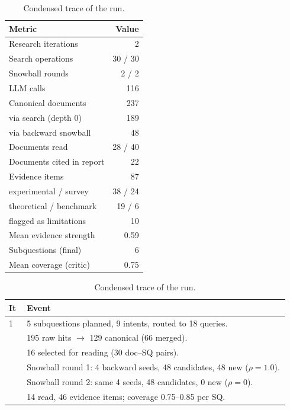 \documentclass{article}
\begin{document}
\begin{table}[t]
\centering
\small
\begin{minipage}[t]{0.44\linewidth}
\centering
\caption{Run summary.}
\label{tab:case}
\begin{tabular}{@{}lr@{}}
\toprule
Metric & Value \\
\midrule
Research iterations          & 2 \\
Search operations            & 30 / 30 \\
Snowball rounds              & 2 / 2 \\
LLM calls                    & 116 \\
Canonical documents          & 237 \\
\quad via search (depth 0)   & 189 \\
\quad via backward snowball  & 48 \\
Documents read               & 28 / 40 \\
Documents cited in report    & 22 \\
Evidence items               & 87 \\
\quad experimental / survey  & 38 / 24 \\
\quad theoretical / benchmark& 19 / 6 \\
\quad flagged as limitations & 10 \\
Mean evidence strength       & 0.59 \\
Subquestions (final)         & 6 \\
Mean coverage (critic)       & 0.75 \\
\bottomrule
\end{tabular}
\end{minipage}%
\hfill
\begin{minipage}[t]{0.53\linewidth}
\centering
\caption{Condensed trace of the run.}
\label{tab:trace}
\begin{tabular}{@{}p{0.06\linewidth}p{0.88\linewidth}@{}}
\toprule
It & Event \\
\midrule
1 & 5 subquestions planned, 9 intents, routed to 18 queries. \\
  & 195 raw hits $\to$ 129 canonical (66 merged). \\
  & 16 selected for reading (30 doc--SQ pairs). \\
  & Snowball round 1: 4 backward seeds, 48 candidates, 48 new ($\rho=1.0$). \\
  & Snowball round 2: same 4 seeds, 48 candidates, 0 new ($\rho=0$). \\
  & 14 read, 46 evidence items; coverage 0.75--0.85 per SQ. \\

\end{tabular}
\end{minipage}
\end{table}
\end{document}
